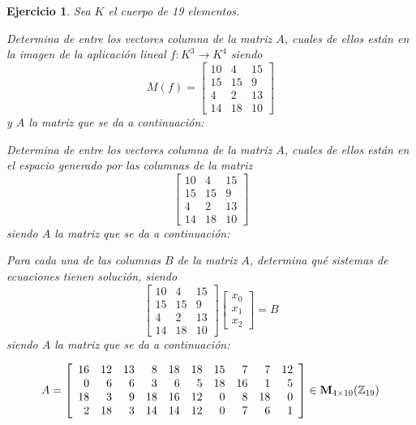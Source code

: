 \documentclass[12pt]{amsart}
\newtheorem{ejer}{Ejercicio}
\begin{document}
\begin{ejer} Sea $K$ el cuerpo de 19 elementos.
\newline
\noindent\begin{minipage}{\textwidth}
\begin{tcolorbox}[colback = green!20!white,title=Versión Núcleo]
Determina de entre los vectores columna de la matriz $A$, cuales de ellos están en la imagen de la aplicación lineal $f:K^{3} \to K^{4}$ siendo  $$ M(f) = \left[\begin{array}{rrr}
10 & 4 & 15 \\
15 & 15 & 9 \\
4 & 2 & 13 \\
14 & 18 & 10
\end{array}\right] $$ y $A$ la matriz que se da a continuación:\end{tcolorbox}
\end{minipage} \newline
\noindent\begin{minipage}{\textwidth}
\begin{tcolorbox}[colback = blue!20!white,title=Versión Anulador]
Determina de entre los vectores columna de la matriz $A$, cuales de ellos están en el espacio generado por las columnas de la matriz $$ \left[\begin{array}{rrr}
10 & 4 & 15 \\
15 & 15 & 9 \\
4 & 2 & 13 \\
14 & 18 & 10
\end{array}\right] $$ siendo $A$ la matriz que se da a continuación:\end{tcolorbox}
\end{minipage} \newline
\noindent\begin{minipage}{\textwidth} 
\begin{tcolorbox}[colback = red!20!white,title=Versión Ecuaciones Implícitas]
Para cada una de las columnas $B$ de la matriz $A$, determina qué sistemas de ecuaciones tienen solución, siendo $$ \left[\begin{array}{rrr}
10 & 4 & 15 \\
15 & 15 & 9 \\
4 & 2 & 13 \\
14 & 18 & 10
\end{array}\right] \left[\begin{array}{r}
x_{0} \\
x_{1} \\
x_{2}
\end{array}\right] = B$$ siendo $A$ la matriz que se da a continuación:
\end{tcolorbox}
\end{minipage}
\[ A = \left[\begin{array}{rrrrrrrrrr}
16 & 12 & 13 & 8 & 18 & 18 & 15 & 7 & 7 & 12 \\
0 & 6 & 6 & 3 & 6 & 5 & 18 & 16 & 1 & 5 \\
18 & 3 & 9 & 18 & 16 & 12 & 0 & 8 & 18 & 0 \\
2 & 18 & 3 & 14 & 14 & 12 & 0 & 7 & 6 & 1
\end{array}\right] \in {\bf M}_{4\times 10}({\mathbb Z}_{19})\]
\end{ejer}
\end{document}
